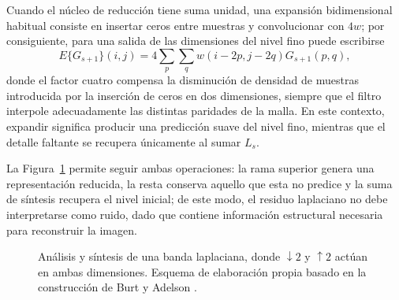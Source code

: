 Cuando el núcleo de reducción tiene suma unidad, una expansión bidimensional habitual consiste en insertar ceros entre muestras y convolucionar con $4w$; por consiguiente, para una salida de las dimensiones del nivel fino puede escribirse
\begin{equation}
 E\{G_{s+1}\}(i,j)=4\sum_{p}\sum_{q}w(i-2p,j-2q)G_{s+1}(p,q),
 \label{eq:piramides_expand_discreto}
\end{equation}
donde el factor cuatro compensa la disminución de densidad de muestras introducida por la inserción de ceros en dos dimensiones, siempre que el filtro interpole adecuadamente las distintas paridades de la malla. En este contexto, expandir significa producir una predicción suave del nivel fino, mientras que el detalle faltante se recupera únicamente al sumar $L_s$.

La Figura~\ref{fig:piramides_analisis_sintesis} permite seguir ambas operaciones: la rama superior genera una representación reducida, la resta conserva aquello que esta no predice y la suma de síntesis recupera el nivel inicial; de este modo, el residuo laplaciano no debe interpretarse como ruido, dado que contiene información estructural necesaria para reconstruir la imagen.

\begin{figure}[htbp]
\centering
{}
\caption[Análisis y síntesis de una banda laplaciana]{Análisis y síntesis de una banda laplaciana, donde $\downarrow 2$ y $\uparrow 2$ actúan en ambas dimensiones. Esquema de elaboración propia basado en la construcción de Burt y Adelson \cite{burt1983laplacian}.}
\label{fig:piramides_analisis_sintesis}
\end{figure}

